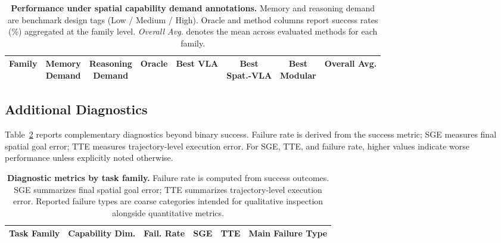 \begin{table}[t]
  \centering
  \small
  \begin{tabular}{l c c c c c c c}
    \toprule
    \rowcolor{HeaderGray}
    Family
      & \makecell{Memory\\Demand}
      & \makecell{Reasoning\\Demand}
      & Oracle & Best VLA & \makecell{Best\\Spat.-VLA}
      & \makecell{Best\\Modular}
      & Overall Avg. \\
    \midrule
    
    \bottomrule
  \end{tabular}
  \caption{\textbf{Performance under spatial capability demand annotations.} Memory and reasoning demand are benchmark design tags (Low / Medium / High). Oracle and method columns report success rates (\%) aggregated at the family level. \emph{Overall Avg.} denotes the mean across evaluated methods for each family.}
  \label{tab:app_capability_demand}
\end{table}

\subsection{Additional Diagnostics}
\label{app:subsec:diagnostics}

Table~\ref{tab:app_diagnostics} reports complementary diagnostics beyond binary success. Failure rate is derived from the success metric; SGE measures final spatial goal error; TTE measures trajectory-level execution error. For SGE, TTE, and failure rate, higher values indicate worse performance unless explicitly noted otherwise.

\begin{table}[t]
  \centering
  \small
  \begin{tabular}{p{3.0cm} p{2.6cm} c c c p{3.6cm}}
    \toprule
    \rowcolor{HeaderGray}
    Task Family & Capability Dim. & Fail. Rate & SGE & TTE & Main Failure Type \\
    \midrule
    
    \bottomrule
  \end{tabular}
  \caption{\textbf{Diagnostic metrics by task family.} Failure rate is computed from success outcomes. SGE summarizes final spatial goal error; TTE summarizes trajectory-level execution error. Reported failure types are coarse categories intended for qualitative inspection alongside quantitative metrics.}
  \label{tab:app_diagnostics}
\end{table}

